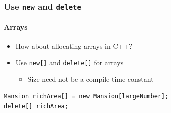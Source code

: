 \documentclass[table]{beamer}
\newcounter{rulecount}
\newcommand{\declarerule}{\textbf{\color{themeblue}{Rule \therulecount:}} }
\begin{document}
\begin{frame}[fragile]
    \frametitle{\declarerule Use \texttt{new} and \texttt{delete} }
    \framesubtitle{Arrays}
    \begin{itemize}
        \item How about allocating arrays in C++?
        \item Use \texttt{new[]} and \texttt{delete[]} for arrays 
            \begin{itemize}
                \item Size need not be a compile-time constant
            \end{itemize}
    \end{itemize}
    \begin{lstlisting}[title=Dynamically allocating an array of objects in C++]
Mansion richArea[] = new Mansion[largeNumber];
delete[] richArea;
    \end{lstlisting}
\end{frame}




\end{document}
